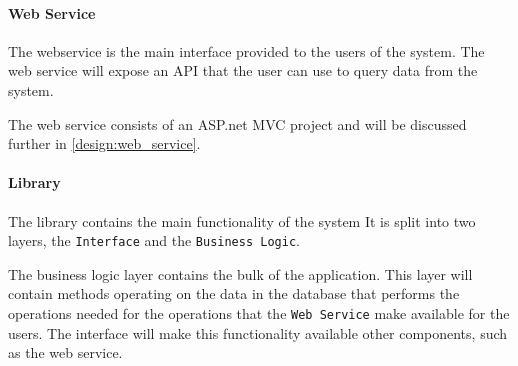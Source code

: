 \paragraph{Web Service}
The webservice is the main interface provided to the users of the system.
The web service will expose an API that the user can use to query data from the system.

The web service consists of an ASP.net MVC project and will be discussed further in \cref{design:web_service}.

\paragraph{Library}
The library contains the main functionality of the system 
It is split into two layers, the \texttt{Interface} and the \texttt{Business Logic}.

The business logic layer contains the bulk of the application.
This layer will contain methods operating on the data in the database that performs the operations needed for the operations that the \texttt{Web Service} make available for the users.
The interface will make this functionality available other components, such as the web service.





